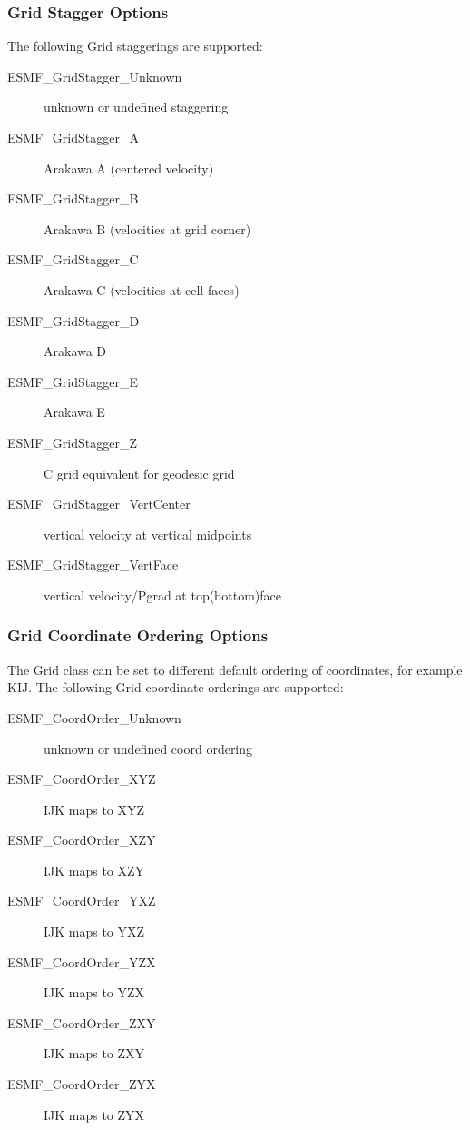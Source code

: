 \subsubsection{Grid Stagger Options}
The following Grid staggerings are supported:
\begin{description}
   \item[ESMF\_GridStagger\_Unknown] unknown or undefined staggering
   \item[ESMF\_GridStagger\_A] Arakawa A (centered velocity)
   \item[ESMF\_GridStagger\_B] Arakawa B (velocities at grid corner)
   \item[ESMF\_GridStagger\_C] Arakawa C (velocities at cell faces)
   \item[ESMF\_GridStagger\_D] Arakawa D
   \item[ESMF\_GridStagger\_E] Arakawa E
   \item[ESMF\_GridStagger\_Z] C grid equivalent for geodesic grid
   \item[ESMF\_GridStagger\_VertCenter] vertical velocity at vertical midpoints
   \item[ESMF\_GridStagger\_VertFace] vertical velocity/Pgrad at top(bottom)face
\end{description}


\subsubsection{Grid Coordinate Ordering Options}
The Grid class can be set to different default ordering of coordinates, for
example KIJ.  The following Grid coordinate orderings are supported:
\begin{description}
   \item[ESMF\_CoordOrder\_Unknown] unknown or undefined coord ordering
   \item[ESMF\_CoordOrder\_XYZ] IJK maps to XYZ
   \item[ESMF\_CoordOrder\_XZY] IJK maps to XZY
   \item[ESMF\_CoordOrder\_YXZ] IJK maps to YXZ
   \item[ESMF\_CoordOrder\_YZX] IJK maps to YZX
   \item[ESMF\_CoordOrder\_ZXY] IJK maps to ZXY
   \item[ESMF\_CoordOrder\_ZYX] IJK maps to ZYX
\end{description}


